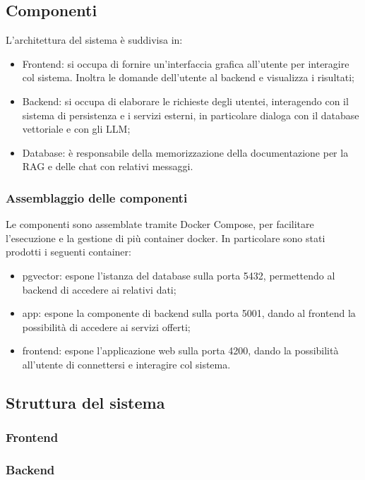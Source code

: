 \subsection{Componenti}
L'architettura del sistema è suddivisa in:
\begin{itemize}
    \item Frontend: si occupa di fornire un'interfaccia grafica all'utente per interagire col sistema. Inoltra le domande dell'utente al backend e visualizza i risultati;
    \item Backend: si occupa di elaborare le richieste degli utentei, interagendo con il sistema di persistenza e i servizi esterni, in particolare dialoga con il database vettoriale e con gli LLM;
    \item Database: è responsabile della memorizzazione della documentazione per la RAG e delle chat con relativi messaggi.
\end{itemize}
\subsubsection{Assemblaggio delle componenti}
Le componenti sono assemblate tramite Docker Compose, per facilitare l'esecuzione e la gestione di più container docker. 
In particolare sono stati prodotti i seguenti container:
\begin{itemize}
    \item pgvector: espone l'istanza del database sulla porta 5432, permettendo al backend di accedere ai relativi dati;
    \item app: espone la componente di backend sulla porta 5001, dando al frontend la possibilità di accedere ai servizi offerti;
    \item frontend: espone l'applicazione web sulla porta 4200, dando la possibilità all'utente di connettersi e interagire col sistema.
\end{itemize}
\subsection{Struttura del sistema}
\subsubsection{Frontend}

\subsubsection{Backend}